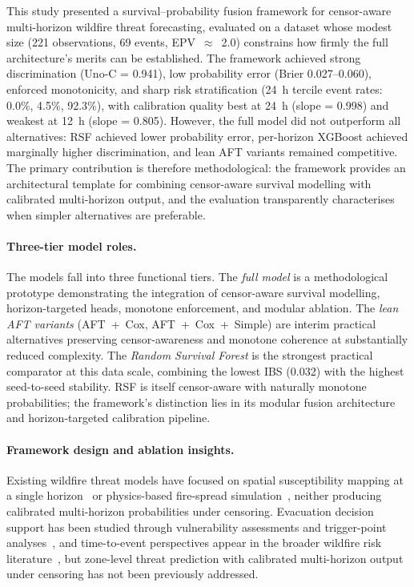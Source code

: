 \documentclass[fire,article,submit,pdftex]{../Definitions/mdpi}
\begin{document}
This study presented a survival--probability fusion framework for censor-aware multi-horizon wildfire threat forecasting, evaluated on a dataset whose modest size (221 observations, 69 events, EPV~$\approx$~2.0) constrains how firmly the full architecture's merits can be established.
The framework achieved strong discrimination (Uno-C = 0.941), low probability error (Brier 0.027--0.060), enforced monotonicity, and sharp risk stratification (24~h tercile event rates: 0.0\%, 4.5\%, 92.3\%), with calibration quality best at 24~h (slope = 0.998) and weakest at 12~h (slope = 0.805).
However, the full model did not outperform all alternatives: RSF achieved lower probability error, per-horizon XGBoost achieved marginally higher discrimination, and lean AFT variants remained competitive.
The primary contribution is therefore methodological: the framework provides an architectural template for combining censor-aware survival modelling with calibrated multi-horizon output, and the evaluation transparently characterises when simpler alternatives are preferable.

\paragraph{Three-tier model roles.}
The models fall into three functional tiers.
The \emph{full model} is a methodological prototype demonstrating the integration of censor-aware survival modelling, horizon-targeted heads, monotone enforcement, and modular ablation.
The \emph{lean AFT variants} (AFT~+~Cox, AFT~+~Cox~+~Simple) are interim practical alternatives preserving censor-awareness and monotone coherence at substantially reduced complexity.
The \emph{Random Survival Forest} is the strongest practical comparator at this data scale, combining the lowest IBS (0.032) with the highest seed-to-seed stability.
RSF is itself censor-aware with naturally monotone probabilities; the framework's distinction lies in its modular fusion architecture and horizon-targeted calibration pipeline.

\paragraph{Framework design and ablation insights.}
Existing wildfire threat models have focused on spatial susceptibility mapping at a single horizon~\cite{Jaafari2019,Gigovic2019,Chen2024wui,Kaur2022} or physics-based fire-spread simulation~\cite{Finney2001,Cruz2003,Shu2020,Pais2021,Zheng2021}, neither producing calibrated multi-horizon probabilities under censoring.
Evacuation decision support has been studied through vulnerability assessments and trigger-point analyses~\cite{Dolan2022,Paveglio2019,Alcasena2019}, and time-to-event perspectives appear in the broader wildfire risk literature~\cite{Xi2019,Taylor2013}, but zone-level threat prediction with calibrated multi-horizon output under censoring has not been previously addressed.
\end{document}

